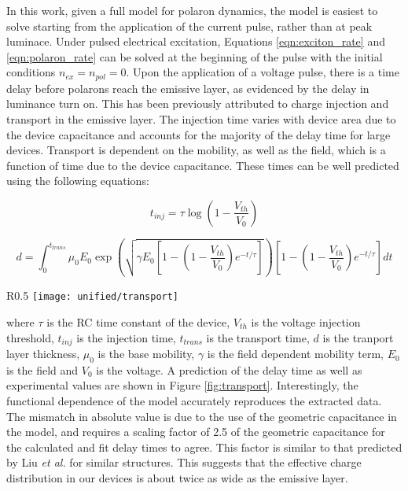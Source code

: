 \documentclass[../thesis.tex]{subfiles}
\begin{document}
In this work, given a full model for polaron dynamics, the model is easiest to solve starting from the application of the current pulse, rather than at peak luminace.
Under pulsed electrical excitation, Equations \ref{eqn:exciton_rate} and \ref{eqn:polaron_rate} can be solved at the beginning of the pulse with the initial conditions $n_{ex}=n_{pol}=0$.  
Upon the application of a voltage pulse, there is a time delay before polarons reach the emissive layer, as evidenced by the delay in luminance turn on.  
This has been previously attributed to charge injection and transport in the emissive layer.\supercite{Wei2004}
The injection time varies with device area due to the device capacitance and accounts for the majority of the delay time for large devices.
Transport is dependent on the mobility, as well as the field, which is a function of time due to the device capacitance.  
These times can be well predicted using the following equations:

\begin{equation}
t_{inj}=\tau\log\left(1-\frac{V_{th}}{V_0}\right)
\end{equation}

\begin{equation}
d=\int_0^{t_{trans}}\mu_0 E_0 \exp \left( \sqrt{\gamma E_0\left[1-\left(1-\frac{V_{th}}{V_0}\right)e^{-t/\tau}\right]}\right)\left[1-\left(1-\frac{V_{th}}{V_0}\right)e^{-t/\tau}\right] dt
\end{equation}

\begin{wrapfigure}{R}{0.5\textwidth}
\centering
\texttt{[image: unified/transport]}
\caption{Extracted polaron injection time is shown as a function of voltage along with a fit from the model.}
\label{fig:transport}
\end{wrapfigure}

where $\tau$ is the RC time constant of the device, $V_{th}$ is the voltage injection threshold, $t_{inj}$ is the injection time, $t_{trans}$ is the transport time, $d$ is the tranport layer thickness, $\mu_0$ is the base mobility, $\gamma$ is the field dependent mobility term, $E_0$ is the field and $V_0$ is the voltage.
A prediction of the delay time as well as experimental values are shown in Figure \ref{fig:transport}.
Interestingly, the functional dependence of the model accurately reproduces the extracted data.
The mismatch in absolute value is due to the use of the geometric capacitance in the model, and requires a scaling factor of 2.5 of the geometric capacitance for the calculated and fit delay times to agree.  This factor is similar to that predicted by Liu \textit{et al.} for similar structures.\supercite{Liu2012d}
This suggests that the effective charge distribution in our devices is about twice as wide as the emissive layer.
\end{document}
